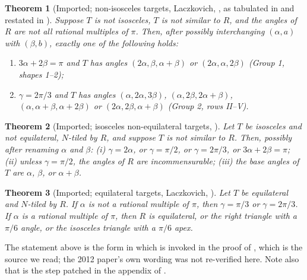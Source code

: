 \documentclass[11pt]{amsart}
\newtheorem{theorem}{Theorem}
\theoremstyle{definition}
\theoremstyle{remark}
\begin{document}
\begin{theorem}[Imported; non-isosceles targets, Laczkovich,
{\cite[Thm.~4.1]{Lacz95}}, as tabulated in {\cite[Table~4]{Beeson7}} and
restated in {\cite[Thm.~9]{BLZ633}}]
\label{thm:imp-nonisosceles}
Suppose $T$ is not isosceles, $T$ is not similar to $R$, and the angles of
$R$ are not all rational multiples of $\pi$.  Then, after possibly
interchanging $(\alpha,a)$ with $(\beta,b)$, exactly one of the following
holds:
\begin{enumerate}[label=\textup{(\alph*)}]
\item $3\alpha+2\beta=\pi$ and $T$ has angles $(2\alpha,\beta,\alpha+\beta)$
      or $(2\alpha,\alpha,2\beta)$ \textup{(Group 1, shapes 1--2)};
\item $\gamma=2\pi/3$ and $T$ has angles $(\alpha,2\alpha,3\beta)$,
      $(\alpha,2\beta,2\alpha+\beta)$, $(\alpha,\alpha+\beta,\alpha+2\beta)$
      or $(2\alpha,2\beta,\alpha+\beta)$ \textup{(Group 2, rows II--V)}.
\end{enumerate}
\end{theorem}

\begin{theorem}[Imported; isosceles non-equilateral targets,
{\cite[Thm.~3]{BeesonPrime}}]\label{thm:imp-isosceles}
Let $T$ be isosceles and not equilateral, $N$-tiled by $R$, and suppose $T$
is not similar to $R$.  Then, possibly after renaming $\alpha$ and $\beta$:
\textup{(i)} $\gamma=2\alpha$, or $\gamma=\pi/2$, or $\gamma=2\pi/3$, or
$3\alpha+2\beta=\pi$; \textup{(ii)} unless $\gamma=\pi/2$, the angles of $R$
are incommensurable; \textup{(iii)} the base angles of $T$ are $\alpha$,
$\beta$, or $\alpha+\beta$.
\end{theorem}

\begin{theorem}[Imported; equilateral targets, Laczkovich,
{\cite[Thm.~3.3]{Lacz12}}]\label{thm:imp-equilateral}
Let $T$ be equilateral and $N$-tiled by $R$.  If $\alpha$ is not a rational
multiple of $\pi$, then $\gamma=\pi/3$ or $\gamma=2\pi/3$.  If $\alpha$ is a
rational multiple of $\pi$, then $R$ is equilateral, or the right triangle
with a $\pi/6$ angle, or the isosceles triangle with a $\pi/6$ apex.
\end{theorem}

\noindent The statement above is the form in which \cite[Thm.~3.3]{Lacz12}
is invoked in the proof of \cite[Thm.~11]{BeesonPrime}, which is the source
we read; the 2012 paper's own wording was not re-verified here.  Note also
that \cite[Lemma~7.1]{Lacz12} is the step patched in the appendix of
\cite{BZRat}.
\end{document}
